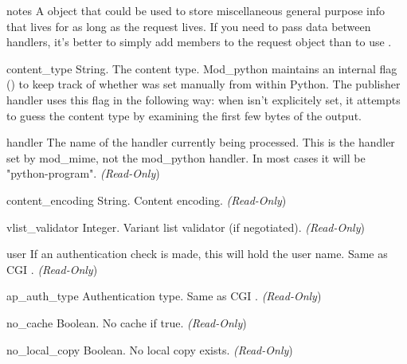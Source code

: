 \begin{memberdesc}[Request]{notes}
A  object that could be used to store miscellaneous
general purpose info that lives for as long as the request lives. If
you need to pass data between handlers, it's better to simply add
members to the request object than to use .
\end{memberdesc}

\begin{memberdesc}[Request]{content_type}
String. The content type. Mod_python maintains an internal flag
() to keep track of whether
 was set manually from within Python. The
publisher handler uses this flag in the following way: when
 isn't explicitely set, it attempts to guess the
content type by examining the first few bytes of the output.
\end{memberdesc}

\begin{memberdesc}[Request]{handler}
The name of the handler currently being processed. This is the handler
set by mod_mime, not the mod_python handler. In most cases it will be
"python-program". \emph{(Read-Only})
\end{memberdesc}

\begin{memberdesc}[Request]{content_encoding}
String. Content encoding.
\emph{(Read-Only})
\end{memberdesc}

\begin{memberdesc}[Request]{vlist_validator}
Integer. Variant list validator (if negotiated).
\emph{(Read-Only})
\end{memberdesc}

\begin{memberdesc}[Request]{user}
If an authentication check is made, this will hold the user
name. Same as CGI .
\emph{(Read-Only})
\end{memberdesc}

\begin{memberdesc}[Request]{ap_auth_type}
Authentication type. Same as CGI .
\emph{(Read-Only})
\end{memberdesc}

\begin{memberdesc}[Request]{no_cache}
Boolean. No cache if true.
\emph{(Read-Only})
\end{memberdesc}

\begin{memberdesc}[Request]{no_local_copy}
Boolean. No local copy exists.
\emph{(Read-Only})
\end{memberdesc}

